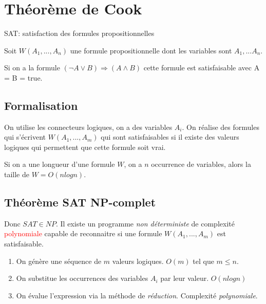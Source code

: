 \documentclass{report}
\begin{document}
\section{Théorème de Cook}
SAT: satisfaction des formules propositionnelles\par
Soit $W(A_1, ..., A_n)$ une formule propositionnelle dont les variables sont $A_1, ... A_n$. \par 
Si on a la formule $(\neg A \vee B ) \Rightarrow (A \wedge B)$ cette formule est satisfaisable avec A = B = true.
\subsection{Formalisation}
On utilise les connecteurs logiques, on a des variables $A_i$. On réalise des formules qui s'écrivent $W(A_1, ... , A_m)$ qui sont satisfaisables si il existe des valeurs logiques qui permettent que cette formule soit vrai.\par 
Si on a une longueur d'une formule $W$, on a $n$ occurrence de variables, alors la taille de $W = O(n log n)$.

\subsection{Théorème SAT NP-complet}
Donc $SAT \in NP$. Il existe un programme \textit{non déterministe} de complexité \textcolor{red}{polynomiale} capable de reconnaitre si une formule $W(A_1, ... , A_m)$ est satisfaisable.
\begin{enumerate}
\item On génère une séquence de $m$ valeurs logiques. $O(m)$ tel que $m \leqslant n$.
\item On substitue les occurrences des variables $A_i$ par leur valeur. $O( n log n)$
\item On évalue l'expression via la méthode de \textit{réduction}. Complexité \textit{polynomiale}.
\end{enumerate}
\end{document}
